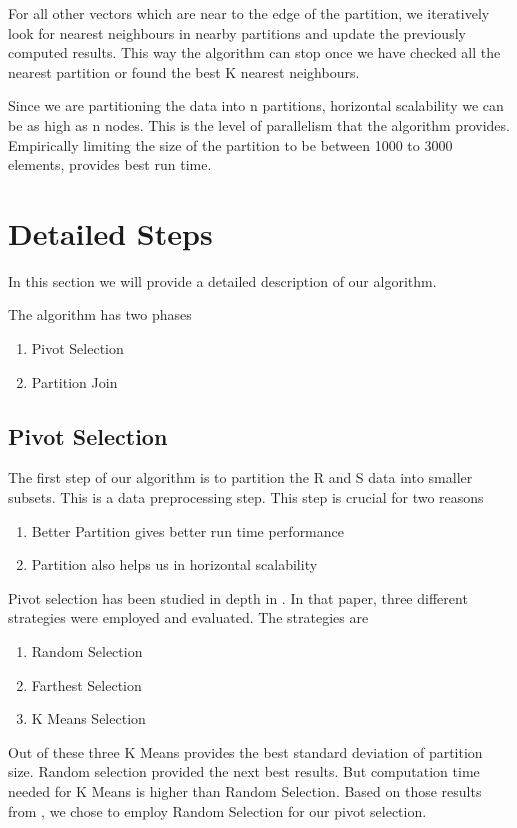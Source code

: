 For all other vectors which are near to the edge of the partition, we
iteratively look for nearest neighbours in nearby partitions and
update the previously computed results. This way the algorithm can
stop once we have checked all the nearest partition or found the best
K nearest neighbours.

Since we are partitioning the data into n partitions, horizontal scalability we can
be as high as n nodes. This is the level of parallelism that
the algorithm provides. Empirically limiting the size of the
partition to be between 1000 to 3000 elements, provides best run time.

\section{Detailed Steps}

In this section we will provide a detailed description of our
algorithm.

The algorithm has two phases
\begin{enumerate}
\item Pivot Selection
\item Partition Join
\end{enumerate}

\subsection{Pivot Selection}
The first step of our algorithm is to partition the R and S data into smaller
subsets. This is a data preprocessing step. This step is crucial for
two reasons

\begin{enumerate}
\item Better Partition gives better run time performance
\item Partition also helps us in horizontal scalability
\end{enumerate}

Pivot selection has been studied in depth in \cite{lu_efficient_2012}.
In that paper, three different strategies were employed and
evaluated. The strategies are
\begin{enumerate}
\item Random Selection
\item Farthest Selection
\item K Means Selection
\end{enumerate}

Out of these three K Means provides the best standard deviation of
partition size. Random selection provided the next best results. But
computation time needed for K Means is higher than Random
Selection. Based on those results from \cite{lu_efficient_2012}, we
chose to employ Random Selection for our pivot selection.

